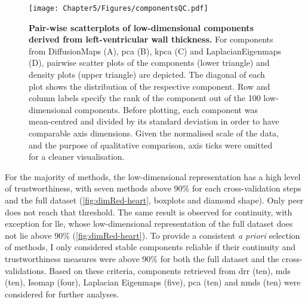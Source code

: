 \begin{figure}[h!]
	\centering
	\texttt{[image: Chapter5/Figures/componentsQC.pdf]}
	\caption[\textbf{Pair-wise scatterplots of low-dimensional components derived from left-ventricular wall thickness. }]{\textbf{Pair-wise scatterplots of low-dimensional components derived from left-ventricular wall thickness. }For components from DiffusionMaps (A), \gls{pca} (B), \gls{kpca} (C) and LaplacianEigenmaps (D),  pairwise scatter plots of the components (lower triangle) and density plots (upper triangle) are depicted. The diagonal of each plot shows the distribution of the respective component. Row and column labels specify the rank of the component out of the \num{100} low-dimensional components. Before plotting, each component was mean-centred and divided by its standard deviation in order to have comparable axis dimensions. Given the normalised scale of the data, and the purpose of qualitative comparison, axis ticks were omitted for a cleaner visualisation. }
	 	\label{fig:distribution-DimRed}
\end{figure}
%
For the majority of methods, the low-dimensional representation has a high level of trustworthiness, with seven methods above \num{90}\% for each cross-validation steps and the full dataset (\cref{fig:dimRed-heart}, boxplots and diamond shape). Only \gls{peer} does not reach that threshold. The same result is observed for continuity, with exception for \gls{lle}, whose low-dimensional representation of the full dataset does not lie above \num{90}\% (\cref{fig:dimRed-heart}).  To provide a consistent \textit{a priori} selection of methods, I only considered stable components reliable if their continuity and trustworthiness measures were above \num{90}\% for both the full dataset and the cross-validations. Based on these criteria, components retrieved from \gls{drr} (ten), \gls{mds} (ten), Isomap (four), Laplacian Eigenmaps (five), \gls{pca} (ten) and \gls{nmds} (ten) were considered for further analyses.

